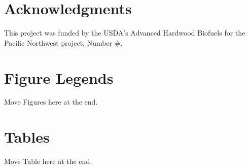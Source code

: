 \documentclass[10pt]{article}
\begin{document}

\section*{Acknowledgments}
This project was funded by the USDA's Advanced Hardwood Biofuels for
the Pacific Northwest project, Number \#.



\section*{Figure Legends}

Move Figures here at the end.

\section*{Tables}

Move Table here at the end.

\end{document}
